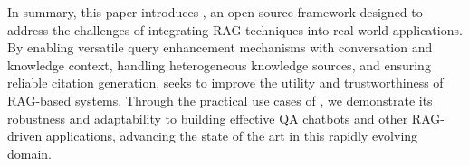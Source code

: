 In summary, this paper introduces \ours, an open-source framework designed to address the challenges of integrating RAG techniques into real-world applications. 
By enabling versatile query enhancement mechanisms with conversation and knowledge context, handling heterogeneous knowledge sources, and ensuring reliable citation generation, \ours seeks to improve the utility and trustworthiness of RAG-based systems. 
Through the practical use cases of \ours, we demonstrate its robustness and adaptability to building effective QA chatbots and other RAG-driven applications, advancing the state of the art in this rapidly evolving domain.
